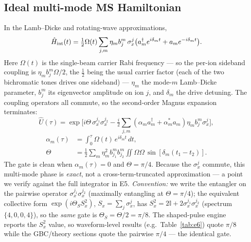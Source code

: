 \documentclass[aps,prapplied,twocolumn,superscriptaddress,floatfix,nofootinbib]{revtex4-2}
\begin{document}
\subsection{Ideal multi-mode MS Hamiltonian}
In the Lamb--Dicke and rotating-wave approximations,
\begin{equation}
\hat H_{\rm int}(t)=\tfrac12\Omega(t)\sum_{j,m}\eta_m b^m_j\,\sigma_x^j
\big(a_m^\dagger e^{i\delta_m t}+a_m e^{-i\delta_m t}\big).
\end{equation}
Here $\Omega(t)$ is the single-beam carrier Rabi frequency --- so the per-ion sideband coupling is
$\eta_m b^m_j\Omega/2$, the $\tfrac12$ being the usual carrier factor (each of the two bichromatic
tones drives one sideband) --- $\eta_m$ the mode-$m$ Lamb--Dicke parameter, $b^m_j$ its eigenvector
amplitude on ion $j$, and $\delta_m$ the drive detuning. The coupling operators all commute, so the
second-order Magnus expansion terminates:
\begin{equation}
\hat U(\tau)=\exp\!\Big[i\Theta\,\sigma_x^{j_1}\sigma_x^{j_2}
-\tfrac{i}{2}\!\sum_{j,m}(\alpha_m a_m^\dagger+\alpha_m^* a_m)\eta_m b^m_j\sigma_x^j\Big],
\end{equation}
\begin{equation}
\begin{aligned}
\alpha_m(\tau)&=\int_0^\tau\!\Omega(t)\,e^{i\delta_m t}\,dt,\\
\Theta&=\tfrac12\sum_m\eta_m^2 b^m_{j_1}b^m_{j_2}\!\iint\!\Omega\Omega\,\sin[\delta_m(t_1{-}t_2)].
\end{aligned}
\end{equation}
The gate is clean when $\alpha_m(\tau)=0$ and $\Theta=\pi/4$. Because the $\sigma_x^j$ commute,
this multi-mode phase is \emph{exact}, not a cross-term-truncated approximation --- a point we
verify against the full integrator in E5.
\emph{Convention:} we write the entangler on the pairwise operator $\sigma_x^{j_1}\sigma_x^{j_2}$
(maximally entangling at $\Theta=\pi/4$); the equivalent collective form $\exp(i\Theta_S S_x^2)$,
$S_x{=}\sum_j\sigma_x^j$, has $S_x^2{=}2\mathbb I{+}2\sigma_x^{j_1}\sigma_x^{j_2}$ (spectrum
$\{4,0,0,4\}$), so the \emph{same} gate is $\Theta_S{=}\Theta/2{=}\pi/8$. The shaped-pulse engine
reports the $S_x^2$ value, so waveform-level results (e.g.\ Table~\ref{tab:e6}) quote $\pi/8$ while
the GBC/theory sections quote the pairwise $\pi/4$ --- the identical gate.
\end{document}
